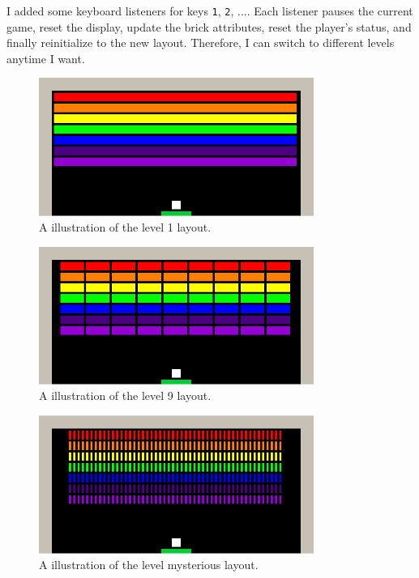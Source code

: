 \documentclass{article}
\newcommand{\code}[1]{\texttt{#1}}
\begin{document}
\begin{enumerate}
    I added some keyboard listeners for keys \code{1}, \code{2}, .... Each listener pauses the current game, reset the display, update the brick attributes, reset the player's status, and finally reinitialize to the new layout. Therefore, I can switch to different levels anytime I want.
    \begin{figure}[h!]
        \centering
        \includegraphics[width=0.8\textwidth]{level_1.png}
        \caption{A illustration of the level 1 layout.}
    \end{figure}
    \begin{figure}[h!]
        \centering
        \includegraphics[width=0.8\textwidth]{level_9.png}
        \caption{A illustration of the level 9 layout.}
    \end{figure}
    \begin{figure}[h!]
        \centering
        \includegraphics[width=0.8\textwidth]{level_0.png}
        \caption{A illustration of the level mysterious layout.}
    \end{figure}


\end{enumerate}
\end{document}

